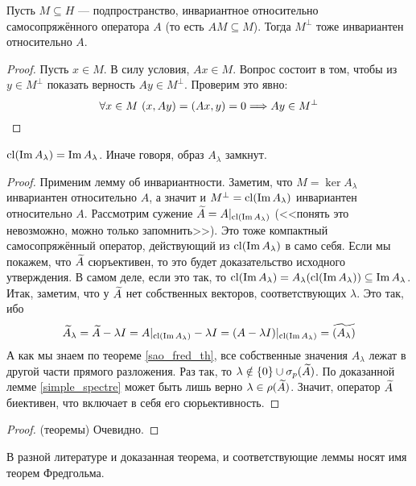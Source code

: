 \begin{lemma}
	Пусть $M \subseteq H$ --- подпространство, инвариантное относительно самосопряжённого оператора $A$ (то есть $AM \subseteq M$). Тогда $M^\bot$ тоже инвариантен относительно $A$.
\end{lemma}

\begin{proof}
	Пусть $x \in M$. В силу условия, $Ax \in M$. Вопрос состоит в том, чтобы из  $y \in M^\bot$ показать верность $Ay \in M^\bot$. Проверим это явно:
	\[
		\forall x \in M\ (x, Ay) = (Ax, y) = 0 \Longrightarrow Ay \in M^\bot
	\]
\end{proof}

\begin{lemma}
	$\operatorname{cl} (\operatorname{Im} A_\lambda) = \operatorname{Im} A_\lambda$. Иначе говоря, образ $A_\lambda$ замкнут.
\end{lemma}

\begin{proof}
	Применим лемму об инвариантности. Заметим, что $M = \ker A_\lambda$ инвариантен относительно $A$, а значит и $M^\bot = \operatorname{cl}(\operatorname{Im} A_\lambda)$ инвариантен относительно $A$. Рассмотрим сужение $\widetilde{A} = A|_{\operatorname{cl}(\operatorname{Im} A_\lambda)}$ (<<понять это невозможно, можно только запомнить>>). Это тоже компактный самосопряжённый оператор, действующий из $\operatorname{cl}(\operatorname{Im} A_\lambda)$ в само себя. Если мы покажем, что $\widetilde{A}$ сюръективен, то это будет доказательство исходного утверждения. В самом деле, если это так, то $\operatorname{cl}(\operatorname{Im} A_\lambda) = A_\lambda(\operatorname{cl}(\operatorname{Im} A_\lambda)) \subseteq \operatorname{Im} A_\lambda$. Итак, заметим, что у $\widetilde{A}$ нет собственных векторов, соответствующих $\lambda$. Это так, ибо
	\[
		\widetilde{A}_\lambda = \widetilde{A} - \lambda I = A|_{\operatorname{cl}(\operatorname{Im} A_\lambda)} - \lambda I = (A - \lambda I)|_{\operatorname{cl}(\operatorname{Im} A_\lambda)} = \widetilde{(A_\lambda)}
	\]
	А как мы знаем по теореме \ref{sao_fred_th}, все собственные значения $A_\lambda$ лежат в другой части прямого разложения. Раз так, то $\lambda \notin \{0\} \cup \sigma_p(\widetilde{A})$. По доказанной лемме \ref{simple_spectre} может быть лишь верно $\lambda \in \rho(\widetilde{A})$. Значит, оператор $\widetilde{A}$ биективен, что включает в себя его сюрьективность.
\end{proof}

\begin{proof} (теоремы)
	Очевидно.
\end{proof}

\begin{note}
	В разной литературе и доказанная теорема, и соответствующие леммы носят имя теорем Фредгольма.
\end{note}

